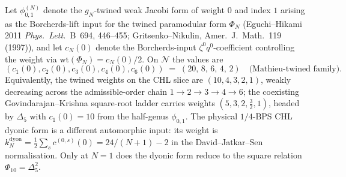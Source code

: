 \begin{lemma}[Tabulated values of \texorpdfstring{$c_N(0)$}{c-N(0)} on
\texorpdfstring{$\mathcal{N} = \{1, 2, 3, 4, 6\}$}{N = 1, 2, 3, 4, 6} for the Mathieu-twined lifts]
\label{lem:c-N-zero-closed-form}
Let $\phi_{0,1}^{(N)}$ denote the $g_N$-twined weak Jacobi form of
weight $0$ and index $1$ arising as the Borcherds-lift input for the
twined paramodular form $\Phi_N$
(Eguchi--Hikami 2011 \emph{Phys.~Lett.}~B~694, 446--455;
Gritsenko--Nikulin, Amer.~J.~Math.~119 (1997)), and let $c_N(0)$
denote the Borcherds-input $\zeta^0 q^0$-coefficient controlling the
weight via $\mathrm{wt}(\Phi_N) = c_N(0)/2$.
On $\mathcal{N}$ the values are
\[
 (c_1(0), c_2(0), c_3(0), c_4(0), c_6(0))
 \;=\; (20,\, 8,\, 6,\, 4,\, 2)
 \quad\text{(Mathieu-twined family)}.
\]
Equivalently, the twined weights on the CHL slice are
$(10, 4, 3, 2, 1)$, weakly decreasing across the
admissible-order chain $1 \to 2 \to 3 \to 4 \to 6$; the coexisting
Govindarajan--Krishna square-root ladder carries weights
$(5, 3, 2, \tfrac32, 1)$, headed by $\Delta_5$ with $c_1(0) = 10$
from the half-genus $\phi_{0,1}$. The physical
$1/4$-BPS CHL dyonic form is a different automorphic input: its weight
is \(k_N^{\mathrm{dyon}}=\frac12\sum_s c^{(0,s)}(0)=24/(N+1)-2\)
in the David--Jatkar--Sen normalisation. Only at \(N=1\) does the
dyonic form reduce to the square relation \(\Phi_{10}=\Delta_5^2\).
\end{lemma}

